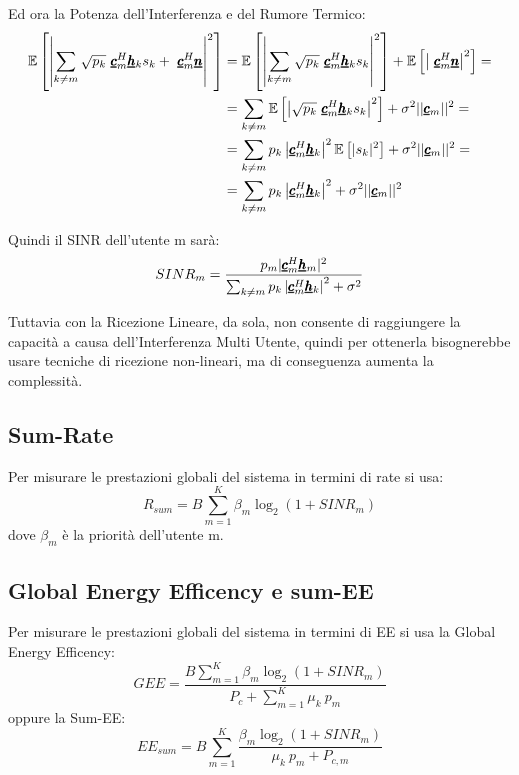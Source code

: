 Ed ora la Potenza dell'Interferenza e del Rumore Termico:
\begin{equation*}
\begin{aligned}
    \av{\left|\sum_{k \neq m} \sqrt{p_k} \ \vc{c}^H_m \vc{h}_k s_k + \ \vc{c}^H_m \vc{n} \right|^2} &= \av{\left|\sum_{k \neq m} \sqrt{p_k} \ \vc{c}^H_m \vc{h}_k s_k \right|^2} + \av{\left| \ \vc{c}^H_m \vc{n} \right|^2} =  \\
    &= \sum_{k \neq m} \av{\left|\sqrt{p_k} \ \vc{c}^H_m \vc{h}_k s_k \right|^2} + \sigma^2 ||\vc{c}_m||^2 = \\
    &= \sum_{k \neq m} p_k \left|\vc{c}^H_m \vc{h}_k  \right|^2 \av{|s_k|^2} + \sigma^2 ||\vc{c}_m||^2 = \\
    &= \sum_{k \neq m} p_k \left|\vc{c}^H_m \vc{h}_k  \right|^2 + \sigma^2 ||\vc{c}_m||^2
\end{aligned}
\end{equation*}

Quindi il SINR dell'utente m sarà:
\begin{equation*}
    SINR_m = \frac{p_m |\pmb{\underline{c}}^H_m \pmb{\underline{h}}_m|^2}{\sum_{k \neq m} p_k \left|\pmb{\underline{c}}^H_m \pmb{\underline{h}}_k  \right|^2 + \sigma^2}
\end{equation*}

Tuttavia con la Ricezione Lineare, da sola, non consente di raggiungere la capacità a causa dell'Interferenza Multi Utente, quindi per ottenerla bisognerebbe usare tecniche di ricezione non-lineari, ma di conseguenza aumenta la complessità.

\subsection{Sum-Rate}
Per misurare le prestazioni globali del sistema in termini di rate si usa:
\begin{equation*}
    R_{sum} = B \sum_{m=1}^K \beta_m \log_2(1 + SINR_m)
\end{equation*}
dove $\beta_m$ è la priorità dell'utente m.

\subsection{Global Energy Efficency e sum-EE}
Per misurare le prestazioni globali del sistema in termini di EE si usa la Global Energy Efficency:
\begin{equation*}
    GEE = \frac{B \sum_{m=1}^K \beta_m \log_2(1 + SINR_m)}{P_c + \sum_{m=1}^K \mu_k \ p_m} 
\end{equation*}
oppure la Sum-EE:
\begin{equation*}
    EE_{sum} = B \sum_{m=1}^K \frac{ \beta_m \log_2(1 + SINR_m)}{\mu_k \ p_m + P_{c,m}} 
\end{equation*}

